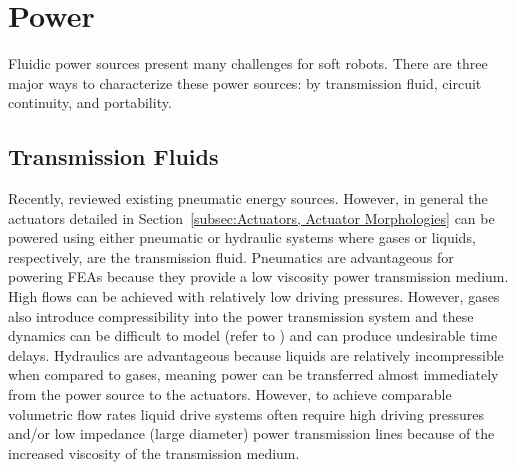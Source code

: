 \section{Power}
\label{sec:Power}
Fluidic power sources present many challenges for soft robots.
There are three major ways to characterize these power sources: by transmission fluid, circuit continuity, and portability.

\subsection{Transmission Fluids}
Recently, \citet{wehnerpneumatic} reviewed existing pneumatic energy sources.
However, in general the actuators detailed in Section~\ref{subsec:Actuators, Actuator Morphologies} can be powered using either pneumatic or hydraulic systems where gases or liquids, respectively, are the transmission fluid.
Pneumatics are advantageous for powering FEAs because they provide a low viscosity power transmission medium.
High flows can be achieved with relatively low driving pressures. 
However, gases also introduce compressibility into the power transmission system and these dynamics can be difficult to model (refer to \citet{marchese2015control}) and can produce undesirable time delays.
Hydraulics are advantageous because liquids are relatively incompressible when compared to gases, meaning power can be transferred almost immediately from the power source to the actuators.
However, to achieve comparable volumetric flow rates liquid drive systems often require high driving pressures and/or low impedance (large diameter) power transmission lines because of the increased viscosity of the transmission medium.


